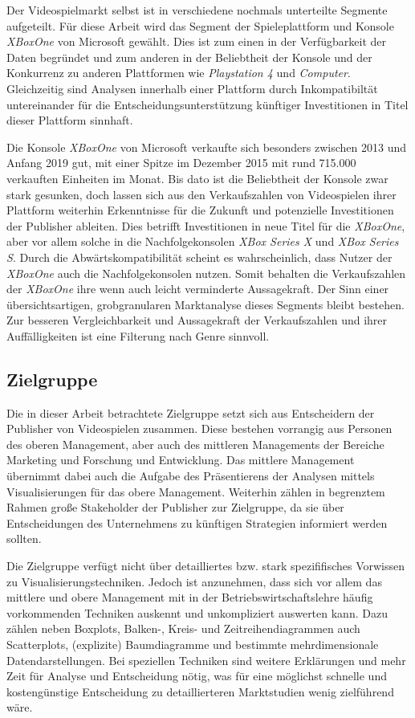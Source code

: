 \documentclass[usegeometry=true]{scrartcl}
\begin{document}
Der Videospielmarkt selbst ist in verschiedene nochmals unterteilte Segmente aufgeteilt. 
Für diese Arbeit wird das Segment der Spieleplattform und Konsole \textit{XBoxOne} von Microsoft gewählt.
Dies ist zum einen in der Verfügbarkeit der Daten begründet und zum anderen in der Beliebtheit der Konsole und der Konkurrenz zu anderen Plattformen wie \textit{Playstation 4} und \textit{Computer}.
Gleichzeitig sind Analysen innerhalb einer Plattform durch Inkompatibiltät untereinander für die Entscheidungsunterstützung künftiger Investitionen in Titel dieser Plattform sinnhaft. 

Die Konsole \textit{XBoxOne} von Microsoft verkaufte sich besonders zwischen 2013 und Anfang 2019 gut, mit einer Spitze im Dezember 2015 mit rund 715.000 verkauften Einheiten im Monat.
Bis dato ist die Beliebtheit der Konsole zwar stark gesunken, doch lassen sich aus den Verkaufszahlen von Videospielen ihrer Plattform weiterhin Erkenntnisse für die Zukunft 
und potenzielle Investitionen der Publisher ableiten.\cite{Statista.2022}
Dies betrifft Investitionen in neue Titel für die \textit{XBoxOne}, aber vor allem solche in die Nachfolgekonsolen \textit{XBox Series X} und \textit{XBox Series S}. 
Durch die Abwärtskompatibilität scheint es wahrscheinlich, dass Nutzer der \textit{XBoxOne} auch die Nachfolgekonsolen nutzen.\cite{GamesWirtschaft.2021} 
Somit behalten die Verkaufszahlen der \textit{XBoxOne} ihre wenn auch leicht verminderte Aussagekraft.
Der Sinn einer übersichtsartigen, grobgranularen Marktanalyse dieses Segments bleibt bestehen.
Zur besseren Vergleichbarkeit und Aussagekraft der Verkaufszahlen und ihrer Auffälligkeiten ist eine Filterung nach Genre sinnvoll.

\subsection{Zielgruppe}
Die in dieser Arbeit betrachtete Zielgruppe setzt sich aus Entscheidern der Publisher von Videospielen zusammen. 
Diese bestehen vorrangig aus Personen des oberen Management, aber auch des mittleren Managements der Bereiche Marketing und Forschung und Entwicklung. 
Das mittlere Management übernimmt dabei auch die Aufgabe des Präsentierens der Analysen mittels Visualisierungen für das obere Management.
Weiterhin zählen in begrenztem Rahmen große Stakeholder der Publisher zur Zielgruppe, 
da sie über Entscheidungen des Unternehmens zu künftigen Strategien informiert werden sollten. 

Die Zielgruppe verfügt nicht über detailliertes bzw. stark spezififisches Vorwissen zu Visualisierungstechniken. 
Jedoch ist anzunehmen, dass sich vor allem das mittlere und obere Management mit in der Betriebswirtschaftslehre häufig vorkommenden Techniken auskennt und unkompliziert auswerten kann.
Dazu zählen neben Boxplots, Balken-, Kreis- und Zeitreihendiagrammen auch Scatterplots, (explizite) Baumdiagramme und bestimmte mehrdimensionale Datendarstellungen. 
Bei speziellen Techniken sind weitere Erklärungen und mehr Zeit für Analyse und Entscheidung nötig,
was für eine möglichst schnelle und kostengünstige Entscheidung zu detaillierteren Marktstudien wenig zielführend wäre.
\end{document}
